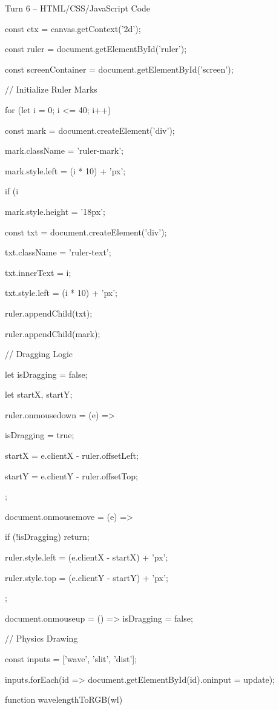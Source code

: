 \documentclass[10pt,a4paper]{article}
\begin{document}
\begin{htmlcodebox}{Turn 6 -- HTML/CSS/JavaScript Code}
{{{{const ctx = canvas.getContext('2d');

const ruler = document.getElementById('ruler');

const screenContainer = document.getElementById('screen');

// Initialize Ruler Marks

for (let i = 0; i <= 40; i++) {

    const mark = document.createElement('div');

    mark.className = 'ruler-mark';

    mark.style.left = (i * 10) + 'px';

    if (i %

        mark.style.height = '18px';

        const txt = document.createElement('div');

        txt.className = 'ruler-text';

        txt.innerText = i;

        txt.style.left = (i * 10) + 'px';

        ruler.appendChild(txt);


    }

    ruler.appendChild(mark);

}

// Dragging Logic

let isDragging = false;

let startX, startY;

ruler.onmousedown = (e) => {

    isDragging = true;

    startX = e.clientX - ruler.offsetLeft;

    startY = e.clientY - ruler.offsetTop;

};

document.onmousemove = (e) => {

    if (!isDragging) return;

    ruler.style.left = (e.clientX - startX) + 'px';

    ruler.style.top = (e.clientY - startY) + 'px';

};

document.onmouseup = () => isDragging = false;

// Physics Drawing

const inputs = ['wave', 'slit', 'dist'];

inputs.forEach(id => document.getElementById(id).oninput = update);

function wavelengthToRGB(wl) {

}}}}
\end{htmlcodebox}
\end{document}
